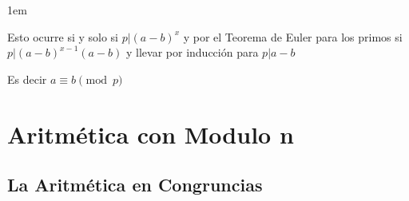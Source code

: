 \documentclass[12pt, fleqn]{report}                             %
\newenvironment{SmallIndentation}[1][0.75em]                    %
    {\begin{adjustwidth}{#1}{}\begin{footnotesize}}                 %
    {\end{footnotesize}\end{adjustwidth}}                           %
\begin{document}
\begin{itemize}
\begin{SmallIndentation}[1em]
                        Esto ocurre si y solo si $p|(a-b)^x$ y por el Teorema de Euler para los
                        primos si $p|(a-b)^{x-1} (a-b)$ y llevar por inducción para $p|a-b$

                        Es decir $a \equiv b \pmod{p}$
                    
                    \end{SmallIndentation}
                        

                \end{itemize}


    \clearpage
    \section{Aritmética con Modulo n}



        \subsection{La Aritmética en Congruncias}
\end{document}
